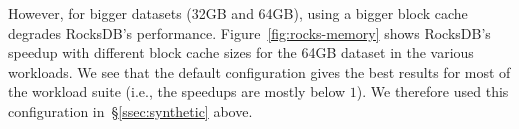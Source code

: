 However, for  bigger datasets (32GB and 64GB),   using a  bigger 
block cache degrades  RocksDB's performance. Figure~\ref{fig:rocks-memory} shows 
RocksDB's speedup with different block cache sizes for the 64GB dataset in the various workloads. 
We see that the default configuration gives the best results for most of the workload suite (i.e., the 
speedups are mostly below $1$). We therefore used this configuration  in~\S\ref{ssec:synthetic} above.   





  